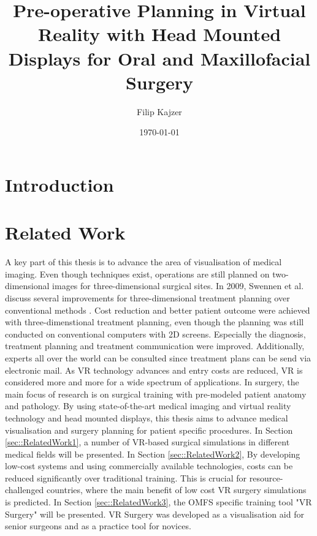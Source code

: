 \documentclass[twoside, parskip]{VRThesis} %
\title{Pre-operative Planning in Virtual Reality with Head Mounted Displays for Oral and Maxillofacial Surgery}
\author{Filip Kajzer}
\date{\today}
\begin{document}
\maketitle
\makecoverMaster %
\maketitleMaster %

\makestatement

\tableofcontents

\chapter{Introduction}



\chapter{Related Work}

A key part of this thesis is to advance the area of visualisation of medical imaging.
Even though techniques exist, operations are still planned on two-dimensional images for three-dimensional surgical sites.
In 2009, Swennen et al. discuss several improvements for three-dimensional treatment planning over conventional methods \cite{swennen2009three}.
Cost reduction and better patient outcome were achieved with three-dimenstional treatment planning, even though the planning was still conducted on conventional computers with 2D screens.
Especially the diagnosis, treatment planning and treatment communication were improved.
Additionally, experts all over the world can be consulted since treatment plans can be send via electronic mail.
As VR technology advances and entry costs are reduced, VR is considered more and more for a wide spectrum of applications.
In surgery, the main focus of research is on surgical training with pre-modeled patient anatomy and pathology.
By using state-of-the-art medical imaging and virtual reality technology and head mounted displays, this thesis aims to advance medical visualisation and surgery planning for patient specific procedures.
In Section \ref{sec::RelatedWork1}, a number of VR-based surgical simulations in different medical fields will be presented.
In Section \ref{sec::RelatedWork2}, 
By developing low-cost systems and using commercially available technologies, costs can be reduced significantly over traditional training.
This is crucial for resource-challenged countries, where the main benefit of low cost VR surgery simulations is predicted.
In Section \ref{sec::RelatedWork3}, the OMFS specific training tool "VR Surgery" will be presented.
VR Surgery was developed as a visualisation aid for senior surgeons and as a practice tool for novices.   
\end{document}
